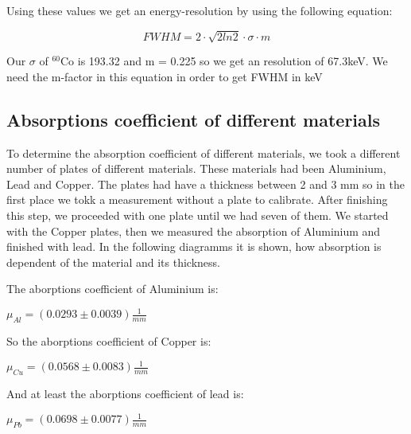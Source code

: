
Using these values we get an energy-resolution by using the following equation:

\begin{equation}
FWHM = 2\cdot \sqrt{2 ln 2} \cdot \sigma \cdot m
\end{equation}

Our $\sigma$ of $^{60}$Co is 193.32 and m =  0.225 so we get an resolution of 67.3keV. We need the m-factor in this equation in order to get FWHM in keV

\subsection{Absorptions coefficient of different materials}
To determine the absorption coefficient of different materials, we took a different number of plates of different materials. These materials had been Aluminium, Lead and Copper. The plates had have a thickness between 2 and 3 mm so in the first place we tokk a measurement without a plate to calibrate. After finishing this step, we proceeded with one plate until we had seven of them. We started with the Copper plates, then we measured the absorption of Aluminium and finished with lead.
In the following diagramms it is shown, how absorption is dependent of the material and its thickness.\\


The aborptions coefficient of Aluminium is:
\begin{center}
$\mu_{Al} = (0.0293 \pm 0.0039)\frac{1}{mm}$
\end{center}


So the aborptions coefficient of Copper is:
\begin{center}
$\mu_{Cu} = (0.0568 \pm 0.0083)\frac{1}{mm}$
\end{center}


And at least the aborptions coefficient of lead is:
\begin{center}
$\mu_{Pb} = (0.0698 \pm 0.0077)\frac{1}{mm}$
\end{center}

